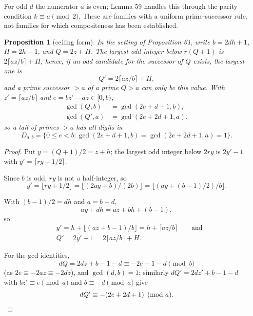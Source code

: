 \documentclass[11pt,reqno]{amsart}
\newtheorem{proposition}[theorem]{Proposition}
\theoremstyle{definition}
\theoremstyle{remark}
\begin{document}
For odd \(d\) the numerator \(a\) is even; Lemma 59 handles this through
the parity condition \(k\equiv a\pmod2\). These are families with a
uniform prime-successor rule, not families for which compositeness has
been established.

\begin{samepage}
\begin{proposition}[ceiling form]\leavevmode\label{thm:62}
In the setting of Proposition 61,
write \(b=2dh+1\), \(H=2h-1\), and \(Q=2z+H\). The largest odd integer
below \(r(Q+1)\) is \(2\lceil az/b\rceil+H\); hence, if an odd candidate
for the successor of \(Q\) exists, the largest one is
\[
Q'=2\lceil az/b\rceil+H,
\]
and a prime successor \(>a\) of a prime
\(Q>a\) can only be this value. With \(z'=\lceil az/b\rceil\) and
\(e=bz'-az\in[0,b)\),
\[
\begin{aligned}
\gcd(Q,b)&=\gcd(2e+d+1,b),\\
\gcd(Q',a)&=\gcd(2e+2d+1,a),
\end{aligned}
\]
so a tail of primes \(>a\) has all digits in
\[
D_{a,b}=\{0\le e<b:\gcd(2e+d+1,b)=\gcd(2e+2d+1,a)=1\}.
\]
\label{thm-end:62}
\end{proposition}
\end{samepage}

\begin{proof}\leavevmode\label{proof:62}
Put \(y=(Q+1)/2=z+h\); the largest odd integer below
\(2ry\) is \(2y'-1\) with \(y'=\lceil ry-1/2\rceil\).

Since \(b\) is
odd, \(ry\) is not a half-integer, so
\[
y'=\lfloor ry+1/2\rfloor
=\lfloor(2ay+b)/(2b)\rfloor=\lfloor(ay+(b-1)/2)/b\rfloor.
\]

With
\((b-1)/2=dh\) and \(a=b+d\),
\[
ay+dh=az+bh+(b-1),
\]
so
\[
\begin{aligned}
&y'=h+\lfloor(az+b-1)/b\rfloor=h+\lceil az/b\rceil\qquad\text{and}\\
&Q'=2y'-1=2\lceil az/b\rceil+H.
\end{aligned}
\]

For the gcd identities,
\[
dQ=2dz+b-1-d\equiv-2e-1-d\pmod b
\]
(as \(2e\equiv-2az\equiv-2dz\)),
and \(\gcd(d,b)=1\); similarly \(dQ'=2dz'+b-1-d\) with
\(bz'\equiv e\pmod a\) and \(b\equiv-d\pmod a\) give
\[
dQ'\equiv-(2e+2d+1)\pmod a.\qedhere
\]
\end{proof}
\end{document}

